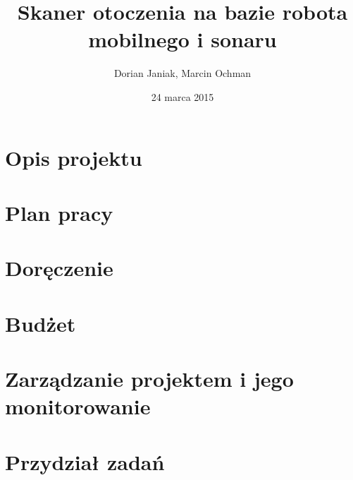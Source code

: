 \documentclass[a4paper]{article}
\begin{document}
   	\title{\vspace{50mm}Skaner otoczenia na bazie robota mobilnego i sonaru}
	\author{Dorian Janiak, Marcin Ochman}
	\date{24 marca 2015}

\maketitle

\newpage

\tableofcontents

\listoftables

\newpage

\section{Opis projektu}


\section{Plan pracy}


\section{Doręczenie}


\section{Budżet}


\section{Zarządzanie projektem i jego monitorowanie}


\section{Przydział zadań}

\end{document}
